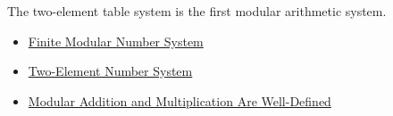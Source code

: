 \begin{remark*}[Interpretation]
The two-element table system is the first modular arithmetic system.
\end{remark*}

\begin{dependencies}
\begin{itemize}
  \item \hyperref[def:finite-modular-number-system]{Finite Modular Number System}
  \item \hyperref[def:two-element-number-system]{Two-Element Number System}
  \item \hyperref[thm:modular-operations-well-defined]{Modular Addition and Multiplication Are Well-Defined}
\end{itemize}
\end{dependencies}
